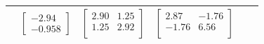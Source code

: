 \documentclass[paper=a4, fontsize=11pt]{scrartcl} %
\numberwithin{equation}{section} %
\numberwithin{figure}{section} %
\numberwithin{table}{section} %
\begin{document}
\begin{table}
\begin{center}
\begin{tabular}{*6l}
				& $\begin{bmatrix}-2.94 \\ -0.958\end{bmatrix}$ 
				& $\begin{bmatrix}
				2.90 & 1.25 \\
				1.25 &  2.92 \\ \end{bmatrix}$
				& $\begin{bmatrix}
				2.87 & -1.76 \\
				-1.76 & 6.56 \\ \end{bmatrix}$			
				\\\bottomrule
				\hline
			\end{tabular}
		\end{center}
	\end{table}
\end{document}
